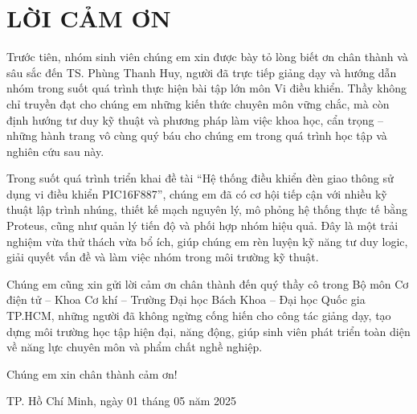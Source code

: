 \section*{LỜI CẢM ƠN}

Trước tiên, nhóm sinh viên chúng em xin được bày tỏ lòng biết ơn chân thành và sâu sắc đến TS. Phùng Thanh Huy, người đã trực tiếp giảng dạy và hướng dẫn nhóm trong suốt quá trình thực hiện bài tập lớn môn Vi điều khiển. Thầy không chỉ truyền đạt cho chúng em những kiến thức chuyên môn vững chắc, mà còn định hướng tư duy kỹ thuật và phương pháp làm việc khoa học, cẩn trọng – những hành trang vô cùng quý báu cho chúng em trong quá trình học tập và nghiên cứu sau này.

Trong suốt quá trình triển khai đề tài “Hệ thống điều khiển đèn giao thông sử dụng vi điều khiển PIC16F887”, chúng em đã có cơ hội tiếp cận với nhiều kỹ thuật lập trình nhúng, thiết kế mạch nguyên lý, mô phỏng hệ thống thực tế bằng Proteus, cũng như quản lý tiến độ và phối hợp nhóm hiệu quả. Đây là một trải nghiệm vừa thử thách vừa bổ ích, giúp chúng em rèn luyện kỹ năng tư duy logic, giải quyết vấn đề và làm việc nhóm trong môi trường kỹ thuật.

Chúng em cũng xin gửi lời cảm ơn chân thành đến quý thầy cô trong Bộ môn Cơ điện tử – Khoa Cơ khí – Trường Đại học Bách Khoa – Đại học Quốc gia TP.HCM, những người đã không ngừng cống hiến cho công tác giảng dạy, tạo dựng môi trường học tập hiện đại, năng động, giúp sinh viên phát triển toàn diện về năng lực chuyên môn và phẩm chất nghề nghiệp.

Chúng em xin chân thành cảm ơn!

\vspace{0.5cm}
\hfill TP. Hồ Chí Minh, ngày 01 tháng 05 năm 2025

